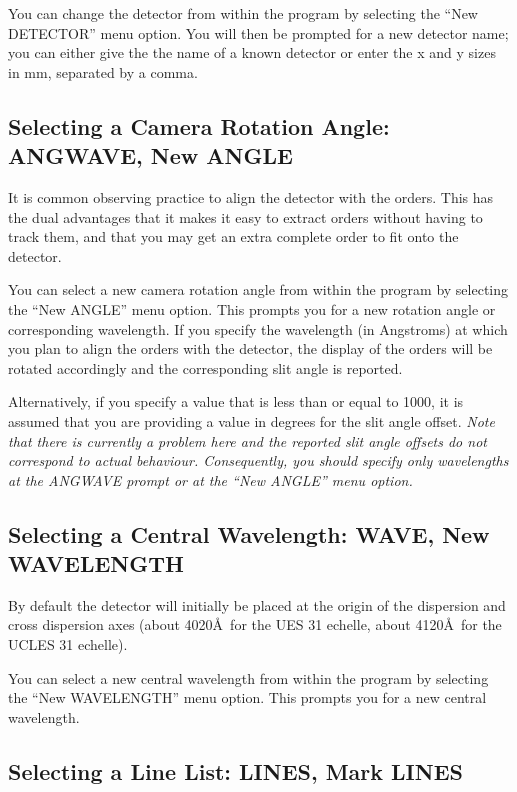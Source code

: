 \documentclass[11pt,nolof,noabs]{starlink}
\begin{document}
You can change the detector from within the program by selecting the ``New
DETECTOR'' menu option. You will then be prompted for a new detector name;
you can either give the the name of a known detector or enter the x and y
sizes in mm, separated by a comma.

\subsection{Selecting a Camera Rotation Angle: ANGWAVE, New ANGLE}

It is common observing practice  to align the detector with the orders.
This has the dual advantages that it makes it easy to extract orders
without having to track them, and that you may get an extra complete order
to fit onto the detector.

You can select a new camera rotation angle from within the program by selecting
the ``New ANGLE'' menu option. This prompts you for a new rotation
angle or corresponding wavelength. If you specify the wavelength (in
Angstroms) at which you plan to align the orders with the detector, the
display of the orders will be rotated accordingly and the corresponding
slit angle is reported.

Alternatively, if you specify a value that is less than or equal to 1000,
it is assumed that you are providing a value in degrees for the slit angle
offset. \emph{Note that there is currently a problem here and the reported
slit angle offsets do not correspond to actual behaviour. Consequently, you
should specify only wavelengths at the ANGWAVE prompt or at the ``New
ANGLE'' menu option.}


\subsection{Selecting a Central Wavelength: WAVE, New WAVELENGTH}

By default the detector will initially be placed at the origin of the
dispersion and cross dispersion axes (about 4020\AA\, for the UES 31
echelle, about 4120\AA\, for the UCLES 31 echelle).

You can select a new central wavelength from within the program by selecting
the ``New WAVELENGTH'' menu option. This prompts you for a new central
wavelength.

\subsection{Selecting a Line List: LINES, Mark LINES}
\end{document}
